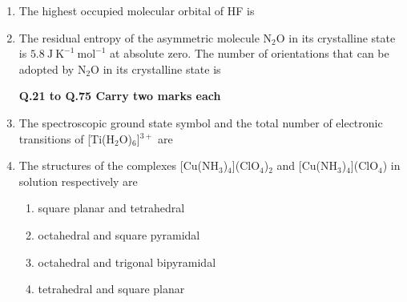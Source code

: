 \documentclass[12pt]{article}
\begin{document}
\begin{enumerate}
\item The highest occupied molecular orbital of HF is
\begin{enumerate}
\end{enumerate}


   \item  The residual entropy of the asymmetric molecule N$_2$O in its crystalline state is $5.8\ \mathrm{J\ K^{-1}\ mol^{-1}}$ at absolute zero. The number of orientations that can be adopted by N$_2$O in its crystalline state is \begin{enumerate}
\hfill{} 
\end{enumerate}


\textbf{Q.21 to Q.75 Carry two marks each}


\item The spectroscopic ground state symbol and the total number of electronic transitions of [Ti(H$_2$O)$_6$]$^{3+}$ are
\begin{enumerate}
\end{enumerate}


\item The structures of the complexes [Cu(NH$_3$)$_4$](ClO$_4$)$_2$ and [Cu(NH$_3$)$_4$](ClO$_4$) in solution respectively are
\begin{enumerate}
\item  square planar and tetrahedral 
\item  octahedral and square pyramidal
\item  octahedral and trigonal bipyramidal 
\item  tetrahedral and square planar    \hfill{}
\end{enumerate}



\end{enumerate}
\end{document}
